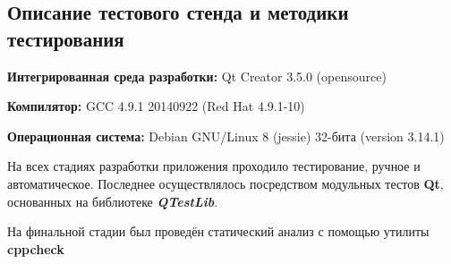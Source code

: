 \documentclass[12pt,a4paper]{report}
\begin{document}
\subsection{Описание тестового стенда и методики тестирования}

\begin{flushleft}
\textbf{Интегрированная среда разработки:} Qt Creator 3.5.0 (opensource)

\textbf{Компилятор:} GCC 4.9.1 20140922 (Red Hat 4.9.1-10)

\textbf{Операционная система:} Debian GNU/Linux 8 (jessie) 32-бита (version 3.14.1)
\end{flushleft}

На всех стадиях разработки приложения проходило тестирование, ручное и автоматическое. Последнее осуществлялось посредством модульных тестов \textbf{Qt}, основанных на библиотеке  \textit{\textbf{QTestLib}}.

На финальной стадии был проведён статический анализ с помощью утилиты \textbf{cppcheck}%
\end{document}
